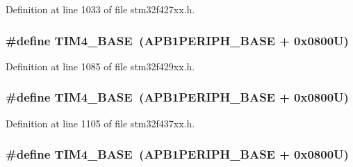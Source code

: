 Definition at line 1033 of file stm32f427xx.\+h.

\subsubsection[{\texorpdfstring{T\+I\+M4\+\_\+\+B\+A\+SE}{TIM4_BASE}}]{\setlength{\rightskip}{0pt plus 5cm}\#define T\+I\+M4\+\_\+\+B\+A\+SE~({\bf A\+P\+B1\+P\+E\+R\+I\+P\+H\+\_\+\+B\+A\+SE} + 0x0800\+U)}\hypertarget{group___peripheral__memory__map_ga56e2d44b0002f316527b8913866a370d}{}\label{group___peripheral__memory__map_ga56e2d44b0002f316527b8913866a370d}


Definition at line 1085 of file stm32f429xx.\+h.

\subsubsection[{\texorpdfstring{T\+I\+M4\+\_\+\+B\+A\+SE}{TIM4_BASE}}]{\setlength{\rightskip}{0pt plus 5cm}\#define T\+I\+M4\+\_\+\+B\+A\+SE~({\bf A\+P\+B1\+P\+E\+R\+I\+P\+H\+\_\+\+B\+A\+SE} + 0x0800\+U)}\hypertarget{group___peripheral__memory__map_ga56e2d44b0002f316527b8913866a370d}{}\label{group___peripheral__memory__map_ga56e2d44b0002f316527b8913866a370d}


Definition at line 1105 of file stm32f437xx.\+h.

\subsubsection[{\texorpdfstring{T\+I\+M4\+\_\+\+B\+A\+SE}{TIM4_BASE}}]{\setlength{\rightskip}{0pt plus 5cm}\#define T\+I\+M4\+\_\+\+B\+A\+SE~({\bf A\+P\+B1\+P\+E\+R\+I\+P\+H\+\_\+\+B\+A\+SE} + 0x0800\+U)}\hypertarget{group___peripheral__memory__map_ga56e2d44b0002f316527b8913866a370d}{}\label{group___peripheral__memory__map_ga56e2d44b0002f316527b8913866a370d}


